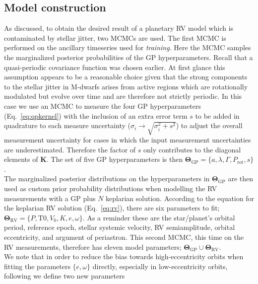\subsection{Model construction}
As discussed, to obtain the desired result of a planetary RV model which is contaminated 
by stellar jitter, two MCMCs are used. The first MCMC is performed on the 
ancillary timeseries used for \emph{training}. Here the MCMC samples the marginalized 
posterior probabilities of the GP hyperparameters. 
Recall that a quasi-periodic covariance function was chosen earlier. 
At first glance this assumption appears to be a reasonable choice given that 
the strong components to the stellar jitter in M-dwarfs arises from active regions 
which are rotationally modulated but evolve over time and are therefore not strictly 
periodic. In this case we use an MCMC to measure the four GP hyperparameters 
(Eq.~\ref{eq:qpkernel}) with the inclusion of an extra error term $s$ to be added in quadrature  
to each measure uncertainty ($\sigma_i \to \sqrt{\sigma_i^2 + s^2}$) 
to adjust the overall measurement uncertainty for cases 
in which the input measurement uncertainties are underestimated. 
Therefore the factor of $s$ only contributes to the diagonal elements of $\mathbf{K}$.  
The set of five GP hyperparameters is then 
$\mathbf{\Theta}_{\mathrm{GP}}=\{a,\lambda,\Gamma,P_{\mathrm{rot}},s\}$. \\

The marginalized posterior distributions on the hyperparameters in 
$\mathbf{\Theta}_{\mathrm{GP}}$ are then used as 
custom prior probability distributions when modelling the RV measurements 
with a GP plus $N$ keplarian solution. According to the equation for the keplarian 
RV solution (Eq.~\ref{eq:rv}), there are six parameters to fit; 
$\mathbf{\Theta}_{\mathrm{RV}} = \{P,\mathrm{T}0,V_0,K,e,\omega\}$. As a reminder these are 
the star/planet's orbital period, reference epoch, stellar systemic velocity, 
RV semiamplitude, orbital eccentricity, and argument of periastron. 
This second MCMC, this time on the RV measurements, therefore has eleven model 
parameters; $\mathbf{\Theta}_{\mathrm{GP}} \cup \mathbf{\Theta}_{\mathrm{RV}}$. \\

We note that in order to reduce the bias towards high-eccentricity orbits when fitting 
the parameters $\{e, \omega \}$ directly, especially in low-eccentricity orbits, following 
\cite{ford06} we define two new parameters 

